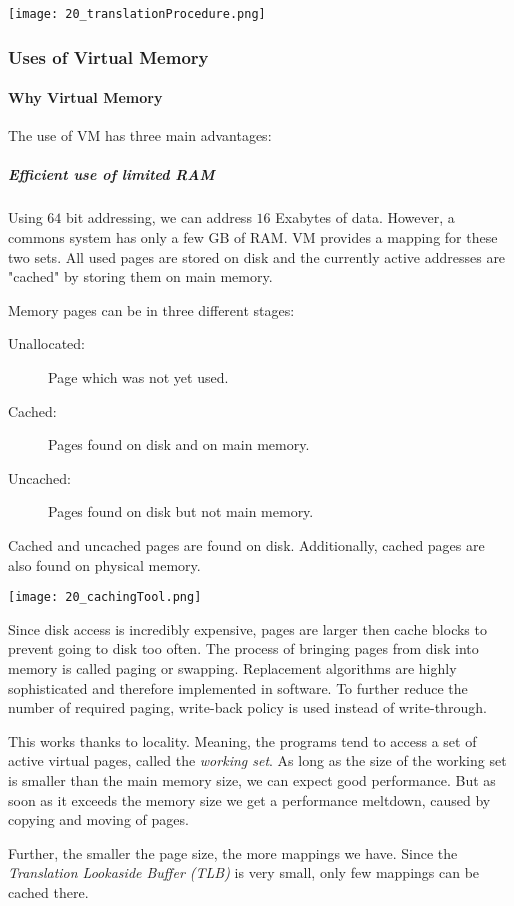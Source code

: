 \texttt{[image: 20\_translationProcedure.png]}

\subsubsection{Uses of Virtual Memory}
\paragraph{Why Virtual Memory}
The use of VM has three main advantages:

\subparagraph{Efficient use of limited RAM}
Using $64$ bit addressing, we can address $16$ Exabytes of data. However, a commons system has only a few GB of RAM. VM provides a mapping for these two sets. All used pages are stored on disk and the currently active addresses are "cached" by storing them on main memory.

Memory pages can be in three different stages:
\begin{description}
    \item[Unallocated:] Page which was not yet used.
    \item[Cached:] Pages found on disk and on main memory.
    \item[Uncached:] Pages found on disk but not main memory.
\end{description}

Cached and uncached pages are found on disk. Additionally, cached  pages are also found on physical memory.

\texttt{[image: 20\_cachingTool.png]}

Since disk access is incredibly expensive, pages are larger then cache blocks to prevent going to disk too often. The process of bringing pages from disk into memory is called paging or swapping. Replacement algorithms are highly sophisticated and therefore implemented in software. To further reduce the number of required paging, write-back policy is used instead of write-through.

This works thanks to locality. Meaning, the programs tend to access a set of active virtual pages, called the \textit{working set}. As long as the size of the working set is smaller than the main memory size, we can expect good performance. But as soon as it exceeds the memory size we get a performance meltdown, caused by copying and moving of pages.

Further, the smaller the page size, the more mappings we have. Since the \textit{Translation Lookaside Buffer (TLB)} is very small, only few mappings can be cached there.

